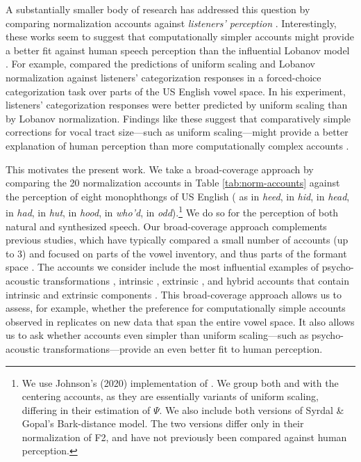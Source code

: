 \documentclass[preprint]{JASA}
\begin{document}
A substantially smaller body of research has addressed this question by comparing normalization accounts against \emph{listeners' perception} \citetext{\citealp{barreda-nearey2012}; \citealp{barreda2021}; \citealp{nearey1989}; \citealp{richter2017}; \citealp[for a review, see][]{whalen2016}}. Interestingly, these works seem to suggest that computationally simpler accounts might provide a better fit against human speech perception than the influential Lobanov model \citep{barreda2021, richter2017}. For example, \citet{barreda2021} compared the predictions of uniform scaling and Lobanov normalization against listeners' categorization responses in a forced-choice categorization task over parts of the US English vowel space. In his experiment, listeners' categorization responses were better predicted by uniform scaling than by Lobanov normalization. Findings like these suggest that comparatively simple corrections for vocal tract size---such as uniform scaling---might provide a better explanation of human perception than more computationally complex accounts \citep[see also][]{johnson2020, richter2017}.

This motivates the present work. We take a broad-coverage approach by comparing the 20 normalization accounts in Table \ref{tab:norm-accounts} against the perception of eight monophthongs of US English (\ipatext{[i]} as in \emph{heed}, \ipatext{[ɪ]} in \emph{hid}, \ipatext{[ɛ]} in \emph{head}, \ipatext{[æ]} in \emph{had}, \ipatext{[ʌ]} in \emph{hut}, \ipatext{[ʊ]} in \emph{hood}, \ipatext{[u]} in \emph{who'd}, \ipatext{[ɑ]} in \emph{odd}).\footnote{We use Johnson's (2020) implementation of \citet{nordstrom-lindblom1975}. We group both \citet{nordstrom-lindblom1975} and \citet{johnson2020} with the centering accounts, as they are essentially variants of uniform scaling, differing in their estimation of \(\Psi\). We also include both versions of Syrdal \& Gopal's Bark-distance model. The two versions differ only in their normalization of F2, and have not previously been compared against human perception.} We do so for the perception of both natural and synthesized speech. Our broad-coverage approach complements previous studies, which have typically compared a small number of accounts (up to 3) and focused on parts of the vowel inventory, and thus parts of the formant space \citep[typically 2-4 vowels,][]{barreda-nearey2012, barreda2021, nearey1989, richter2017}. The accounts we consider include the most influential examples of psycho-acoustic transformations \citep{glasberg-moore1990, fant2002, stevens-volkmann1940, traunmuller1981}, intrinsic \citep{syrdal-gopal1986}, extrinsic \citep{gerstman1968, johnson2020, lobanov1971, mcmurray-jongman2011, nearey1978, nordstrom-lindblom1975}, and hybrid accounts that contain intrinsic and extrinsic components \citep{miller1989}. This broad-coverage approach allows us to assess, for example, whether the preference for computationally simple accounts observed in \citet{barreda2021} replicates on new data that span the entire vowel space. It also allows us to ask whether accounts even simpler than uniform scaling---such as psycho-acoustic transformations---provide an even better fit to human perception.
\end{document}

